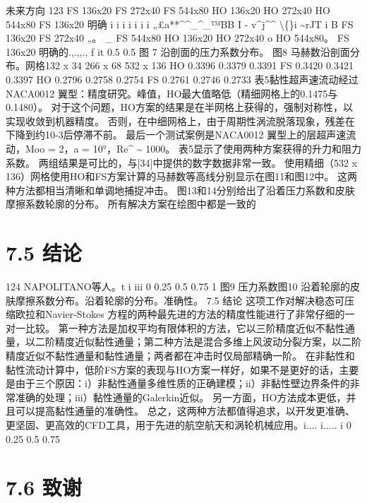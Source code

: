 \documentclass[UTF8,11pt,a4paper,openany,fontset=fandol]{ctexbook}
\begin{document}
未来方向 123 FS 136x20 FS 272x40 FS 544x80 HO 136x20 HO 272x40 HO 544x80 FS 136x20 明确 i i i i i i i „£a**\textasciicircum{}\textasciicircum{}\_\textasciicircum{}\_™BB I - v\textasciicircum{}j\textasciicircum{}\textasciicircum{} \textbackslash\{\}i \textasciitilde{}rJT i B FS 136x20 FS 272x40 „。 \_ FS 544x80 HO 136x20 HO 272x40 o HO 544x80。 FS 136x20 明确的.,.,,., f it 0.5 0.5 图 7 沿剖面的压力系数分布。 图8 马赫数沿剖面分布。网格132 x 34 266 x 68 532 x 136 HO 0.3396 0.3379 0.3391 FS 0.3420 0.3421 0.3397 HO 0.2796 0.2758 0.2754 FS 0.2761 0.2746 0.2733 表5黏性超声速流动经过NACA0012 翼型：精度研究。峰值，HO最大值略低（精细网格上的0.1475与0.1480）。 对于这个问题，HO方案的结果是在半网格上获得的，强制对称性，以实现收敛到机器精度。 否则，在中细网格上，由于周期性涡流脱落现象，残差在下降到约10-3后停滞不前。 最后一个测试案例是NACA0012 翼型上的层超声速流动，Moo = 2，a = 10°，Re\textasciicircum{} \textasciitilde{} 1000。 表5显示了使用两种方案获得的升力和阻力系数。 两组结果是可比的，与[34]中提供的数字数据非常一致。 使用精细（532 x 136）网格使用HO和FS方案计算的马赫数等高线分别显示在图11和图12中。 这两种方法都相当清晰和单调地捕捉冲击。 图13和14分别给出了沿着压力系数和皮肤摩擦系数轮廓的分布。 所有解决方案在绘图中都是一致的

\section{7.5 结论}
124 NAPOLITANO等人。t i iii 0 0.25 0.5 0.75 1 图9 压力系数图10 沿着轮廓的皮肤摩擦系数分布。沿着轮廓的分布。准确性。 7.5 结论 这项工作对解决稳态可压缩欧拉和Navier-Stokes 方程的两种最先进的方法的精度性能进行了非常仔细的一对一比较。 第一种方法是加权平均有限体积的方法，它以三阶精度近似不黏性通量，以二阶精度近似黏性通量；第二种方法是混合多维上风波动分裂方案，以二阶精度近似不黏性通量和黏性通量；两者都在冲击时仅局部精确一阶。 在非黏性和黏性流动计算中，低阶FS方案的表现与HO方案一样好，如果不是更好的话，主要是由于三个原因：i）非黏性通量多维性质的正确建模；ii）非黏性壁边界条件的非常准确的处理；iii）黏性通量的Galerkin近似。 另一方面，HO方法成本更低，并且可以提高黏性通量的准确性。 总之，这两种方法都值得追求，以开发更准确、更坚固、更高效的CFD工具，用于先进的航空航天和涡轮机械应用。i.... i..... i 0 0.25 0.5 0.75

\section{7.6 致谢}
\end{document}
